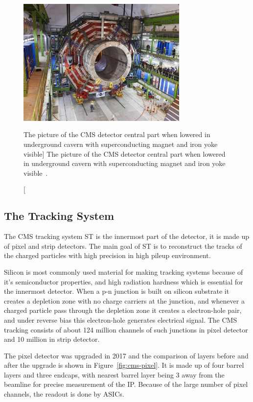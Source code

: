 \begin{figure}[!ht]
  \centering
  \includegraphics[width=0.75\textwidth]{figures/cms_magnet_lowered.jpg}
  \caption%
  [The picture of the CMS detector central part when lowered in underground
    cavern with superconducting magnet and iron
    yoke visible]%
  {The picture of the CMS detector central part when lowered in underground
    cavern with superconducting magnet and iron
    yoke visible~\cite{image-cms-magnet}.}%
  \label{fig:cms-magnet}
\end{figure}


\subsection{
  The Tracking System
}

The \gls{CMS} tracking system \gls{ST} is the innermost part of the detector, it
is made up of pixel and strip detectors. The main goal of \gls{ST} is to
reconstruct the tracks of the charged particles with high precision in high pileup
environment.

Silicon is most commonly used material for making tracking systems because of it's
semiconductor properties, and high radiation hardness which is essential for the
innermost detector. When a p-n junction is built on silicon substrate it creates
a depletion zone with no charge carriers at the junction, and whenever
a charged particle pass through the depletion zone it creates a electron-hole pair,
and under reverse bias this electron-hole generates electrical signal. The \gls{CMS}
tracking consists of about 124 million channels of such junctions in
pixel detector and 10 million in strip detector.

The pixel detector was upgraded in 2017 and the comparison of layers before
and after the upgrade is shown in Figure~\ref{fig:cms-pixel}. It is made up of
four barrel layers and three endcaps, with nearest barrel layer being 3\cm{}
away from the beamline for precise measurement of the \gls{IP}.
Because of the large number of pixel channels, the readout is done by \glspl{ASIC}.

